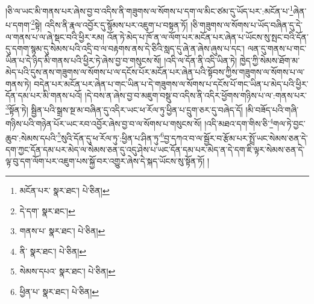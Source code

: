 །ཅི་ལ་ཡང་མི་གནས་པར་ཞེས་བྱ་བ་འདིས་ནི་གཟུགས་ལ་སོགས་པ་དག་ལ་མིང་ཙམ་དུ་ཡོད་པར་:མངོན་པ་\footnote{མངོན་པར་  སྣར་ཐང་།  པེ་ཅིན། }ཞེན་པ་དགག་\footnote{དེ་དག་  སྣར་ཐང་། }སྟེ། འདིས་ནི་རྣལ་འབྱོར་དུ་སྙོམས་པར་འཇུག་པ་བསྟན་ཏོ། །ཅི་གཟུགས་ལ་སོགས་པ་ཡོད་བཞིན་དུ་དེ་ལ་གནས་པ་ལ་ཞེ་སྡང་བའི་ཕྱིར་རམ། འོན་ཏེ་མེད་པ་ཁོ་ན་ལ་ལོག་པར་མངོན་པར་ཞེན་པ་ཡོངས་སུ་སྤང་བའི་དོན་དུ་དགག་སྙམ་དུ་སེམས་པའི་འདྲི་བ་ལ་བརྟགས་ནས་དེ་ཅིའི་སླད་དུ་ཞེ་ན་ཞེས་ཞུས་པ་དང་། ལན་དུ་གནས་པ་གང་ཡིན་པ་དེ་ཉིད་མི་གནས་པའི་ཕྱིར་ཏེ་ཞེས་བྱ་བ་གསུངས་སོ། །འདི་ལ་དོན་ནི་འདི་ཡིན་ཏེ། ཁྱེད་ཀྱི་སེམས་ཐོག་མ་མེད་པའི་དུས་ནས་གཟུགས་ལ་སོགས་པ་ལ་དངོས་པོར་མངོན་པར་ཞེན་པའི་སྟོབས་ཀྱིས་གཟུགས་ལ་སོགས་པ་ལ་གནས་ཏེ། བདེན་པར་མངོན་པར་ཞེན་པ་གང་ཡིན་པ་དེ་གཟུགས་ལ་སོགས་པ་དངོས་པོ་གང་ཡིན་པ་མེད་པའི་ཕྱིར་དོན་དམ་པར་མི་གནས་པའོ། །དེ་བས་ན་ཞེས་བྱ་བ་མཇུག་བསྡུ་བ་འདིས་ནི་འདིར་ཕྱོགས་གཉིས་པ་ལ་:གནས་པར་\footnote{གནས་པ་  སྣར་ཐང་།  པེ་ཅིན། }སྟོན་ཏེ། སྦྱིན་པའི་སྒྲས་སྔ་མ་བཞིན་དུ་འདིར་ཡང་ཕ་རོལ་ཏུ་ཕྱིན་པ་དྲུག་ཅར་དུ་བཞེད་དོ། །མི་བཟོད་པའི་གཞི་གཉིས་པའི་གཉེན་པོར་ཡང་རབ་འབྱོར་ཞེས་བྱ་བ་ལ་སོགས་པ་གསུངས་སོ། །འདི་མཐའ་དག་གིས་ཅི་\footnote{ནི་  སྣར་ཐང་།  པེ་ཅིན། }གལ་ཏེ་བྱང་ཆུབ་:སེམས་དཔའི་\footnote{སེམས་དཔའ་  སྣར་ཐང་།  པེ་ཅིན། }སུའི་དོན་དུ་ཕ་རོལ་ཏུ་:ཕྱིན་པ་ཤིན་ཏུ་\footnote{ཕྱིན་པ་  སྣར་ཐང་།  པེ་ཅིན། }བྱ་དཀའ་བ་ལ་སྦྱོར་བ་རྩོམ་པར་སྤྲོ་ཡང་སེམས་ཅན་དེ་དག་ཀྱང་དོན་དམ་པར་མེད་ལ་སེམས་ཅན་དུ་འདུ་ཤེས་པ་ཡང་དོན་དམ་པར་མེད་ན་དེ་དག་ཇི་ལྟར་སེམས་ཅན་དེ་ལྟ་བུ་དག་ལོག་པར་འཇུག་པས་སྐྱོ་བར་འགྱུར་ཞེས་དེ་སྐད་ཡོངས་སུ་སྟོན་ཏོ། །
